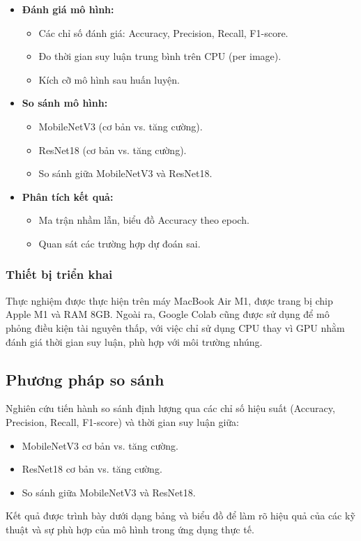 \begin{itemize}
    \item \textbf{Đánh giá mô hình:}
    \begin{itemize}
        \item Các chỉ số đánh giá: Accuracy, Precision, Recall, F1-score.
        \item Đo thời gian suy luận trung bình trên CPU (per image).
        \item Kích cỡ mô hình sau huấn luyện.
    \end{itemize}

    \item \textbf{So sánh mô hình:}
    \begin{itemize}
        \item MobileNetV3 (cơ bản vs. tăng cường).
        \item ResNet18 (cơ bản vs. tăng cường).
        \item So sánh giữa MobileNetV3 và ResNet18.
    \end{itemize}
    
    \item \textbf{Phân tích kết quả:}
    \begin{itemize}
        \item Ma trận nhầm lẫn, biểu đồ Accuracy theo epoch.
        \item Quan sát các trường hợp dự đoán sai.
    \end{itemize}
\end{itemize}

\subsubsection{Thiết bị triển khai}
Thực nghiệm được thực hiện trên máy MacBook Air M1, được trang bị chip Apple M1 và RAM 8GB. Ngoài ra, Google Colab cũng được sử dụng để mô phỏng điều kiện tài nguyên thấp, với việc chỉ sử dụng CPU thay vì GPU nhằm đánh giá thời gian suy luận, phù hợp với môi trường nhúng.

\subsection{Phương pháp so sánh}
Nghiên cứu tiến hành so sánh định lượng qua các chỉ số hiệu suất (Accuracy, Precision, Recall, F1-score) và thời gian suy luận giữa:
\begin{itemize}
    \item MobileNetV3 cơ bản vs. tăng cường.
    \item ResNet18 cơ bản vs. tăng cường.
    \item So sánh giữa MobileNetV3 và ResNet18.
\end{itemize}

Kết quả được trình bày dưới dạng bảng và biểu đồ để làm rõ hiệu quả của các kỹ thuật và sự phù hợp của mô hình trong ứng dụng thực tế.